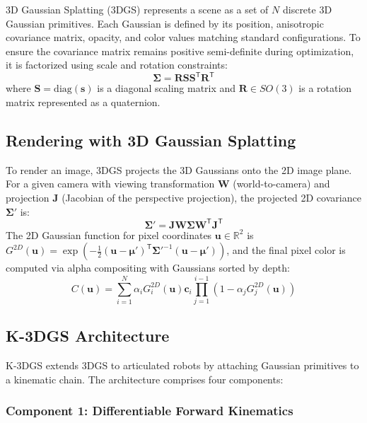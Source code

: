\documentclass[12pt,a4paper,oneside]{report}
\begin{document}
3D Gaussian Splatting (3DGS) represents a scene as a set of $N$ discrete 3D Gaussian primitives. Each Gaussian is defined by its position, anisotropic covariance matrix, opacity, and color values matching standard configurations. To ensure the covariance matrix remains positive semi-definite during optimization, it is factorized using scale and rotation constraints:
\begin{equation}
\boldsymbol{\Sigma} = \mathbf{R} \mathbf{S} \mathbf{S}^\mathsf{T} \mathbf{R}^\mathsf{T}
\end{equation}
where $\mathbf{S} = \text{diag}(\mathbf{s})$ is a diagonal scaling matrix and $\mathbf{R} \in SO(3)$ is a rotation matrix represented as a quaternion.

\subsection{Rendering with 3D Gaussian Splatting}

To render an image, 3DGS projects the 3D Gaussians onto the 2D image plane. For a given camera with viewing transformation $\mathbf{W}$ (world-to-camera) and projection $\mathbf{J}$ (Jacobian of the perspective projection), the projected 2D covariance $\boldsymbol{\Sigma}'$ is:
\begin{equation}
\boldsymbol{\Sigma}' = \mathbf{J} \mathbf{W} \boldsymbol{\Sigma} \mathbf{W}^\mathsf{T} \mathbf{J}^\mathsf{T}
\end{equation}
The 2D Gaussian function for pixel coordinates $\mathbf{u} \in \mathbb{R}^2$ is $G^{2D}(\mathbf{u}) = \exp\left(-\frac{1}{2} (\mathbf{u} - \boldsymbol{\mu}')^\mathsf{T} \boldsymbol{\Sigma}'^{-1} (\mathbf{u} - \boldsymbol{\mu}')\right)$, and the final pixel color is computed via alpha compositing with Gaussians sorted by depth:
\begin{equation}
C(\mathbf{u}) = \sum_{i=1}^{N} \alpha_i G_i^{2D}(\mathbf{u}) \mathbf{c}_i \prod_{j=1}^{i-1} (1 - \alpha_j G_j^{2D}(\mathbf{u}))
\end{equation}

\subsection{K-3DGS Architecture}

K-3DGS extends 3DGS to articulated robots by attaching Gaussian primitives to a kinematic chain. The architecture comprises four components:

\subsubsection{Component 1: Differentiable Forward Kinematics}
\end{document}
